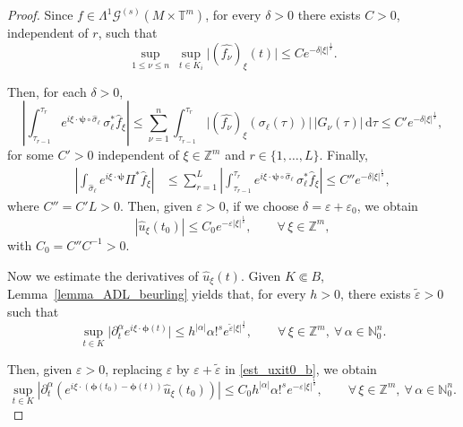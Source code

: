 \documentclass[11pt,reqno]{amsart}
\numberwithin{equation}{section}
\begin{document}
\begin{proof}
		Since \(f\in\mathsf{\Lambda}^1\mathscr{G}^{(s)}(M\times\mathbb{T}^m)\), for every \(\delta>0\) there exists \(C>0\), independent of \(r\), such that
		\[
		\sup_{1\leq \nu\leq n}\ \sup_{t\in K_i}\bigl|(\widehat{f_\nu})_\xi(t)\bigr|
		\leq
		Ce^{-\delta|\xi|^{\frac{1}{s}}}.
		\]
		
		Then, for each \(\delta>0\),
		\[
		\left|\int_{\tau_{r-1}}^{\tau_r}
		e^{i\xi\cdot\boldsymbol{\psi}\circ\hat\sigma_\ell}\,\sigma_\ell^*\widehat{f}_\xi\right|
		\leq
		\sum_{\nu=1}^n\int_{\tau_{r-1}}^{\tau_r}
		\bigl|(\widehat{f_\nu})_\xi(\sigma_\ell(\tau))\bigr|\,|G_\nu(\tau)|\,\mathrm{d}\tau
		\leq
		C'e^{-\delta|\xi|^{\frac{1}{s}}},
		\]
		for some \(C'>0\) independent of \(\xi\in\mathbb{Z}^m\) and \(r\in\{1,\dots,L\}\).
		Finally,
		\begin{align*}
			\left|\int_{\hat{\sigma}_\ell}e^{i\xi\cdot \boldsymbol{\psi}}\Pi^*\widehat{f}_\xi\right|
			&\leq
			\sum_{r=1}^L
			\left|\int_{\tau_{r-1}}^{\tau_r}
			e^{i\xi\cdot \boldsymbol{\psi}\circ\hat\sigma_\ell}\,\sigma_\ell^*\widehat{f}_\xi\right|
			\leq
			C''e^{-\delta|\xi|^{\frac{1}{s}}},
		\end{align*}
		where \(C''=C'L>0\).
		Then, given \(\varepsilon>0\), if we choose \(\delta = \varepsilon + \varepsilon_0\), we obtain
		\begin{equation}\label{est_uxit0_b}
			|\widehat{u}_\xi(t_0)|
			\leq
			C_0e^{-\varepsilon|\xi|^{\frac{1}{s}}},
			\qquad \forall\,\xi\in\mathbb{Z}^m,
		\end{equation}
		with \(C_0=C''C^{-1}>0\).
		
		Now we estimate the derivatives of \(\widehat{u}_\xi(t)\).
		Given \(K\Subset B\), Lemma~\ref{lemma_ADL_beurling} yields that, for every \(h>0\), there exists \(\widetilde{\varepsilon}>0\) such that
		\[
		\sup_{t\in K}\bigl|\partial_t^\alpha e^{i\xi\cdot\boldsymbol{\phi}(t)}\bigr|
		\leq
		h^{|\alpha|}\alpha!^s e^{\widetilde{\varepsilon}|\xi|^{\frac{1}{s}}},\qquad\forall\,\xi\in\mathbb{Z}^m,\ \forall\,\alpha\in\mathbb{N}_0^n.
		\]
		
		Then, given \(\varepsilon>0\), replacing \(\varepsilon\) by \(\varepsilon+\widetilde{\varepsilon}\) in \eqref{est_uxit0_b}, we obtain
		\begin{equation}\label{est_eu_b}
			\sup_{t\in K} \left|\partial_t^\alpha\!\left(e^{i\xi\cdot (\boldsymbol{\phi}(t_0)-\boldsymbol{\phi}(t))}\widehat{u}_\xi(t_0)\right)\right| \leq C_0h^{|\alpha|} \alpha!^s e^{-\varepsilon|\xi|^{\frac{1}{s}}},\qquad\forall\,\xi\in\mathbb{Z}^m,\ \forall\,\alpha\in\mathbb{N}_0^n.
		\end{equation}
		

\end{proof}
\end{document}
